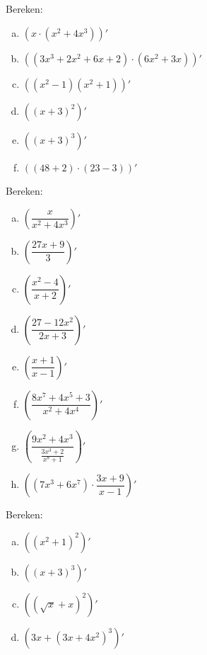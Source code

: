 \documentclass[12pt]{article}
\begin{document}
\begin{oefening}
  Bereken:
  \begin{multicols}{2}
  \begin{enumerate}[(a)]
  \itemsep1em
  \item $\displaystyle\left( x\cdot(x^2+4x^3) \right)'$
  \item $\displaystyle\left( (3x^3+2x^2+6x+2)\cdot(6x^2+3x) \right)'$
  \item $\displaystyle\left( (x^2-1)(x^2+1) \right)'$
  \item $\displaystyle\left( (x+3)^2 \right)'$
  \item $\displaystyle\left( (x+3)^3 \right)'$
  \item $\displaystyle\left( (48+2)\cdot(23-3) \right)'$
  \end{enumerate}
  \end{multicols}
\end{oefening}

\begin{oefening}
  Bereken:
  \begin{multicols}{2}
  \begin{enumerate}[(a)]
  \itemsep1em
  \item $\displaystyle\left( \dfrac{x}{x^2+4x^3} \right)'$
  \item $\displaystyle\left( \dfrac{27x+9}{3} \right)'$
  \item $\displaystyle\left( \dfrac{x^2-4}{x+2} \right)'$
  \item $\displaystyle\left( \dfrac{27-12x^2}{2x+3} \right)'$
  \item $\displaystyle\left( \dfrac{x+1}{x-1} \right)'$
  \item $\displaystyle\left( \dfrac{8x^7+4x^5+3}{x^2+4x^4} \right)'$
  \item $\displaystyle\left( \dfrac{9x^2+4x^3}{\frac{3x^3+2}{x^8+1}} \right)'$
  \item $\displaystyle\left( (7x^3+6x^7)\cdot\dfrac{3x+9}{x-1} \right)'$
  \end{enumerate}
  \end{multicols}
\end{oefening}

\begin{oefening}
  Bereken:
  \begin{multicols}{2}
  \begin{enumerate}[(a)]
  \itemsep1em
  \item $\displaystyle\left( (x^2+1)^2 \right)'$
  \item $\displaystyle\left( (x+3)^3 \right)'$
  \item $\displaystyle\left( (\sqrt{x}+x)^2 \right)'$
  \item $\displaystyle\left( 3x+(3x+4x^2)^3 \right)'$
  \end{enumerate}
  \end{multicols}
\end{oefening}
\end{document}
